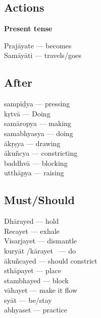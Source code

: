 \subsection*{Actions}

\textbf{Present tense}

\begin{multicols}{2}
Prajāyate --- becomes \\
Samāyāti  --- travels/goes 
\end{multicols}

\subsection*{After}

\begin{multicols}{2}
sampīḍya --- pressing \\
kṛtvā --- Doing \\
samāropya --- making \\
samabhyasya --- doing \\
ākṛṣya --- drawing \\
ākuñcya --- constricting \\
baddhvā --- blocking \\
utthāpya --- raising 
\end{multicols}

\subsection*{Must/Should}

\begin{multicols}{2}
Dhārayed --- hold \\
Recayet --- exhale  \\
Visarjayet --- dismantle \\
kuryāt /kārayet  --- do \\
ākuñcayed --- should constrict\\
sthāpayet --- place\\
stambhayed --- block\\
vāhayet --- make it flow\\
syāt --- be/stay\\
abhyaset --- practice
\end{multicols}

